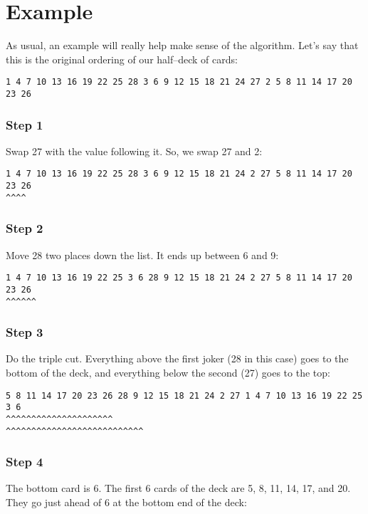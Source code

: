 \documentclass[]{article}
\begin{document}
\newpage
\section{Example}
As usual, an example will really help make sense of the algorithm.  Let's
say that this is the original ordering of our half--deck of cards:


\begin{verbatim}
1 4 7 10 13 16 19 22 25 28 3 6 9 12 15 18 21 24 27 2 5 8 11 14 17 20 23 26
\end{verbatim}

\subsubsection*{Step 1}
Swap 27 with the value following it.  So, we swap 27 and 2:

\begin{verbatim}
1 4 7 10 13 16 19 22 25 28 3 6 9 12 15 18 21 24 2 27 5 8 11 14 17 20 23 26
^^^^
\end{verbatim}


\subsubsection*{Step 2} 
Move 28 two places down the list.  It ends up between 6 and 9:


\begin{verbatim}
1 4 7 10 13 16 19 22 25 3 6 28 9 12 15 18 21 24 2 27 5 8 11 14 17 20 23 26
^^^^^^
\end{verbatim}

\subsubsection*{Step 3} 
Do the triple cut.  
Everything above the first joker (28 in this case) goes to the bottom of the deck, and everything below the second (27)
goes to the top:


\begin{verbatim}
5 8 11 14 17 20 23 26 28 9 12 15 18 21 24 2 27 1 4 7 10 13 16 19 22 25 3 6
^^^^^^^^^^^^^^^^^^^^^                          ^^^^^^^^^^^^^^^^^^^^^^^^^^^
\end{verbatim}


\subsubsection*{Step 4}
The bottom card is 6.  The first 6 cards of the deck are 5, 8, 11,
14, 17, and 20.  They go just ahead of 6 at the bottom end of the deck:
\end{document}
